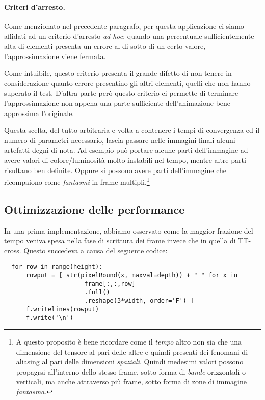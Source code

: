 \documentclass[11pt,a4paper]{article}
\begin{document}
\paragraph{Criteri d'arresto.}
Come menzionato nel precedente paragrafo, per questa applicazione ci siamo affidati ad un criterio d'arresto \emph{ad-hoc}: quando una percentuale sufficientemente alta di elementi presenta un errore al di sotto di un certo valore, l'approssimazione viene fermata.

Come intuibile, questo criterio presenta il grande difetto di non tenere in considerazione quanto errore presentino gli altri elementi, quelli che non hanno superato il test.
D'altra parte però questo criterio ci permette di terminare l'approssimazione non appena una parte sufficiente dell'animazione bene approssima l'originale.

Questa scelta, del tutto arbitraria e volta a contenere i tempi di convergenza ed il numero di parametri necessario, lascia passare nelle immagini finali alcuni artefatti degni di nota. Ad esempio può portare alcune parti dell'immagine ad avere valori di colore/luminosità molto instabili nel tempo, mentre altre parti risultano ben definite. Oppure si possono avere parti dell'immagine che ricompaiono come \emph{fantasmi} in frame  multipli.\footnote{A questo proposito è bene ricordare come il \emph{tempo} altro non sia che una dimensione del tensore al pari delle altre e quindi presenti dei fenomani di aliasing al pari delle dimensioni \emph{spaziali}. Quindi medesimi valori possono propagrsi all'interno dello stesso frame, sotto forma di \emph{bande} orizzontali o verticali, ma anche attraverso più frame, sotto forma di zone di immagine \emph{fantasma}.}

\subsection{Ottimizzazione delle performance}
In una prima implementazione,  abbiamo osservato come la maggior frazione del tempo veniva spesa nella fase di scrittura dei frame invece che in quella di TT-cross.
Questo succedeva a causa del seguente codice: 

\begin{lstlisting}
  for row in range(height):
      rowput = [ str(pixelRound(x, maxval=depth)) + " " for x in 
                      frame[:,:,row]
                      .full()
                      .reshape(3*width, order='F') ]
      f.writelines(rowput)
      f.write('\n')
\end{lstlisting}
\end{document}
